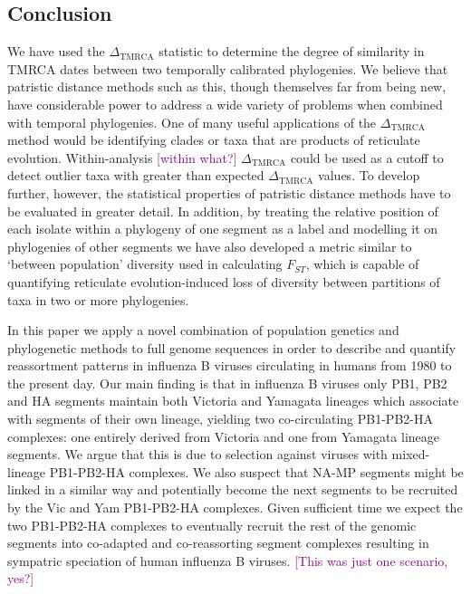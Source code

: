 \documentclass[11pt,oneside,letterpaper]{article}
\def\tbc#1{\textcolor{purple}{[#1]}}
\newcommand{\dtmrca}{\Delta_\mathrm{TMRCA}}
\begin{document}
\subsection*{Conclusion}
We have used the $\dtmrca$ statistic to determine the degree of similarity in TMRCA dates between two temporally calibrated phylogenies.
We believe that patristic distance methods such as this, though themselves far from being new, have considerable power to address a wide variety of problems when combined with temporal phylogenies.
One of many useful applications of the $\dtmrca$ method would be identifying clades or taxa that are products of reticulate evolution.
Within-analysis \tbc{within what?} $\dtmrca$ could be used as a cutoff to detect outlier taxa with greater than expected $\dtmrca$ values.
To develop further, however, the statistical properties of patristic distance methods have to be evaluated in greater detail.
In addition, by treating the relative position of each isolate within a phylogeny of one segment as a label and modelling it on phylogenies of other segments we have also developed a metric similar to `between population' diversity used in calculating $F_{ST}$, which is capable of quantifying reticulate evolution-induced loss of diversity between partitions of taxa in two or more phylogenies.

In this paper we apply a novel combination of population genetics and phylogenetic methods to full genome sequences in order to describe and quantify reassortment patterns in influenza B viruses circulating in humans from 1980 to the present day.
Our main finding is that in influenza B viruses only PB1, PB2 and HA segments maintain both Victoria and Yamagata lineages which associate with segments of their own lineage, yielding two co-circulating PB1-PB2-HA complexes: one entirely derived from Victoria and one from Yamagata lineage segments.
We argue that this is due to selection against viruses with mixed-lineage PB1-PB2-HA complexes.
We also suspect that NA-MP segments might be linked in a similar way and potentially become the next segments to be recruited by the Vic and Yam PB1-PB2-HA complexes.
Given sufficient time we expect the two PB1-PB2-HA complexes to eventually recruit the rest of the genomic segments into co-adapted and co-reassorting segment complexes resulting in sympatric speciation of human influenza B viruses.
\tbc{This was just one scenario, yes?}

\newpage
\end{document}
